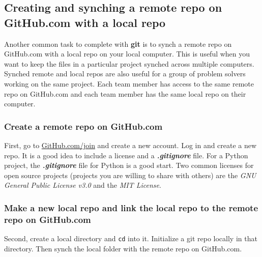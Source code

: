 \documentclass{book}
\newcommand{\passthrough}[1]{#1}
\begin{document}
    
        \hypertarget{creating-and-synching-a-remote-repo-on-github.com-with-a-local-repo}{%
\subsection{Creating and synching a remote repo on GitHub.com with a
local
repo}\label{creating-and-synching-a-remote-repo-on-github.com-with-a-local-repo}}
    




    
        Another common task to complete with \textbf{git} is to synch a remote
repo on GitHub.com with a local repo on your local computer. This is
useful when you want to keep the files in a particular project synched
across multiple computers. Synched remote and local repos are also
useful for a group of problem solvers working on the same project. Each
team member has access to the same remote repo on GitHub.com and each
team member has the same local repo on their computer.

\hypertarget{create-a-remote-repo-on-github.com}{%
\subsubsection{Create a remote repo on
GitHub.com}\label{create-a-remote-repo-on-github.com}}

First, go to \href{https://github.com/join}{GitHub.com/join} and create
a new account. Log in and create a new repo. It is a good idea to
include a license and a \textbf{\emph{.gitignore}} file. For a Python
project, the \textbf{\emph{.gitignore}} file for Python is a good start.
Two common licenses for open source projects (projects you are willing
to share with others) are the \emph{GNU General Public License v3.0} and
the \emph{MIT License}.

\hypertarget{make-a-new-local-repo-and-link-the-local-repo-to-the-remote-repo-on-github.com}{%
\subsubsection{Make a new local repo and link the local repo to the
remote repo on
GitHub.com}\label{make-a-new-local-repo-and-link-the-local-repo-to-the-remote-repo-on-github.com}}

Second, create a local directory and \passthrough{\lstinline!cd!} into
it. Initialize a git repo locally in that directory. Then synch the
local folder with the remote repo on GitHub.com.
\end{document}
